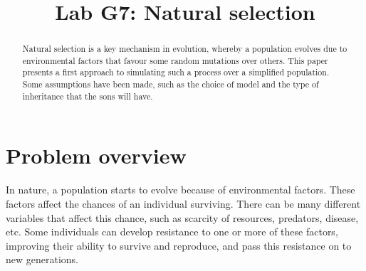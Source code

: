 \documentclass[conference]{IEEEtran}
\begin{document}
\title{
Lab G7: Natural selection
}

\author{
}

\maketitle
\begin{abstract}
    Natural selection is a key mechanism in evolution, whereby a population evolves due to environmental factors that favour some random mutations over others.
    This paper presents a first approach to simulating such a process over a simplified population. 
    Some assumptions have been made, such as the choice of model and the type of inheritance that the sons will have. 
\end{abstract}

\section{Problem overview}

    In nature, a population starts to evolve because of environmental factors. 
    These factors affect the chances of an individual surviving. 
    There can be many different variables that affect this chance, such as scarcity of resources, predators, disease, etc. 
    Some individuals can develop resistance to one or more of these factors, improving their ability to survive and reproduce, and pass this resistance on to new generations. 


\end{document}
